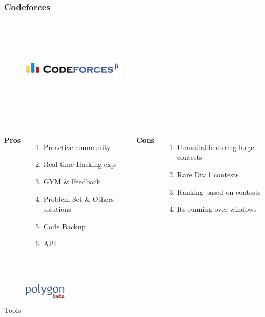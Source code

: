 \documentclass{beamer}
\begin{document}

\begin{frame}
	\frametitle{Codeforces}
	\begin{figure}[t]
		\href{http://codeforces.com/help}{\includegraphics[width=5cm,height=5cm,keepaspectratio]{images/judges/codeforces}}
	\end{figure}
	
	\begin{columns}[c] %
		\textbf{Pros}
		\begin{enumerate}
			\item Proactive community 
			\item Real time Hacking exp.
			\item GYM \& Feedback
			\item Problem Set \& Others solutions
			\item Code Backup 
			\item \href{http://codeforces.com/api/help}{API}
		\end{enumerate}
		\textbf{Cons}
		\begin{enumerate}
			\item Unavailable during large contests
			\item Rare Div.1 contests
			\item Ranking based on contests
			\item Its running over windows
		\end{enumerate}
	\end{columns}
	\begin{block}{Tools}
	\center
	\href{https://polygon.codeforces.com/} {\includegraphics[width=2.2cm,height=2.2cm,keepaspectratio]{images/tools/polygon}}
	\end{block}

\end{frame}
\end{document}
